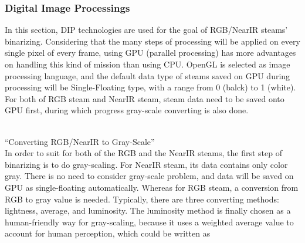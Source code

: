 \subsubsection{Digital Image Processings}
In this section, DIP technologies are used for the goal of RGB/NearIR steams' binarizing. Considering that the many steps of processing will be applied on every single pixel of every frame, using GPU (parallel processing) has more advantages on handling this kind of mission than using CPU. OpenGL is selected as image processing language, and the default data type of steams saved on GPU during processing will be Single-Floating type, with a range from 0 (balck) to 1 (white). For both of RGB steam and NearIR steam, steam data need to be saved onto GPU first, during which progress gray-scale converting is also done.\\%
\\\par%
 \qquad \enquote{Converting RGB/NearIR to Gray-Scale}\\%
In order to suit for both of the RGB and the NearIR steams, the first step of binarizing is to do gray-scaling. For NearIR steam, its data contains only color gray. There is no need to consider gray-scale problem, and data will be saved on GPU as single-floating automatically. Whereas for RGB steam, a conversion from RGB to gray value is needed. Typically, there are three converting methods: lightness, average, and luminosity. The luminosity method is finally chosen as a human-friendly way for gray-scaling, because it uses a weighted average value to account for human perception, which could be written as

